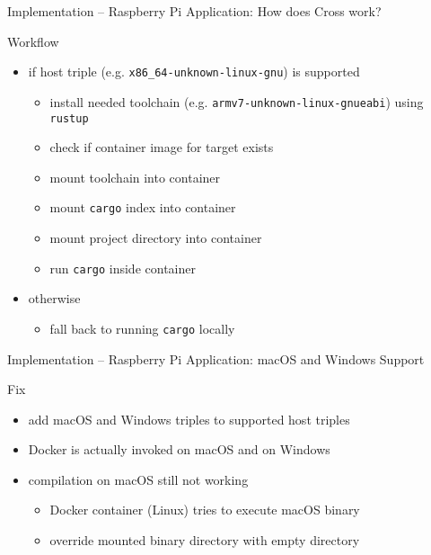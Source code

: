 \begin{frame}{Implementation -- Raspberry Pi Application: How does Cross work?}
  \begin{block}{Workflow}
     \begin{itemize}
       \item if host triple (e.g. \texttt{x86\_64-unknown-linux-gnu}) is supported
         \begin{itemize}
          \item install needed toolchain (e.g. \texttt{armv7-unknown-linux-gnueabi}) using \texttt{rustup}
          \item check if container image for target exists
          \item mount toolchain into container
          \item mount \texttt{cargo} index into container
          \item mount project directory into container
          \item run \texttt{cargo} inside container
         \end{itemize}
       \item otherwise
         \begin{itemize}
           \item fall back to running \texttt{cargo} locally
         \end{itemize}
    \end{itemize}
  \end{block}
\end{frame}

\begin{frame}{Implementation -- Raspberry Pi Application: macOS and Windows Support}
  \begin{block}{Fix}
    \begin{itemize}
      \item add macOS and Windows triples to supported host triples
    \end{itemize}
  \end{block}

  \begin{block}{}
    \begin{itemize}
      \item Docker is actually invoked on macOS and on Windows
    \end{itemize}
  \end{block}

  \begin{block}{}
    \begin{itemize}
      \item compilation on macOS still not working
        \begin{itemize}
          \item {} Docker container (Linux) tries to execute macOS binary
          \item {} override mounted binary directory with empty directory
        \end{itemize}
    \end{itemize}
  \end{block}
\end{frame}

